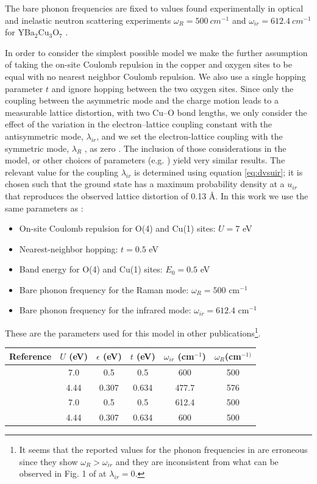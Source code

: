 The bare phonon frequencies are fixed to values found experimentally in optical and inelastic neutron scattering experiments $\omega_R = 500\ cm^{-1}$ and $\omega_{ir} = 612.4\ cm^{-1}$ for YBa$_2$Cu$_3$O$_7$ \cite{?}.

In order to consider the simplest possible model we make the further assumption of taking the on-site Coulomb repulsion in the copper and oxygen sites to be equal with no nearest neighbor Coulomb repulsion. 
We also use a single hopping parameter $t$ and ignore hopping between the two oxygen sites. 
Since only the coupling between the asymmetric mode and the charge motion leads to a measurable lattice distortion, with two Cu–O bond lengths, we only consider the effect of the variation in the electron–lattice coupling constant with the antisymmetric mode, $\lambda_{ir}$, and we set the electron-lattice coupling with the symmetric mode, $\lambda_R$ , as zero \cite{Salkola1995}. 
The inclusion of those considerations in the model, or other choices of parameters (e.g. \cite{Salkola1994, Salkola1995}) yield very similar results.
The relevant value for the coupling $\lambda_{ir}$ is determined using equation \ref{eq:dvsuir}; it is chosen such that the ground state has a maximum probability density at a $u_{ir}$ that reproduces the observed lattice distortion of 0.13 \AA \cite{?}.
In this work we use the same parameters as \cite{Mena2006, DeLeon1999, Leon2008, MirandaMena2007}:

\begin{itemize}
\item On-site Coulomb repulsion for O(4) and Cu(1) sites: $U=7$ eV
\item Nearest-neighbor hopping: $t=0.5$ eV
\item Band energy for O(4) and Cu(1) sites: $E_0=0.5$ eV
\item Bare phonon frequency for the Raman mode: $\omega_R=500$ cm$^{-1}$
\item Bare phonon frequency for the infrared mode: $\omega_{ir}=612.4$ cm$^{-1}$
\end{itemize}

These are the parameters used for this model in other publications\footnote{It seems that the reported values for the phonon frequencies in \cite{Salkola1994, Salkola1995} are erroneous since they show $\omega_R > \omega_{ir}$ and they are inconsistent from what can be observed in Fig. 1 of \cite{Salkola1994} at $\lambda_{ir}=0$.}.

\noindent\begin{tabular}{| l | c | c | c | c | c |}
\hline
Reference & $U$ (eV) & $\epsilon$ (eV) & $t$ (eV) & $\omega_{ir}$ (cm$^{-1}$) & $\omega_R$(cm$^{-1)}$ \\
\hline
\cite{MustredeLeon1992} & 7.0 & 0.5 & 0.5 & 600 & 500 \\ 
\cite{Salkola1994, Salkola1995} & 4.44 & 0.307 & 0.634 & 477.7 & 576  \\
\cite{Mena2006,DeLeon1999, Leon2008, MirandaMena2007} & 7.0 & 0.5 & 0.5 & 612.4 & 500 \\ 
\cite{MustredeLeon2000} & 4.44 & 0.307 & 0.634 & 600 & 500 \\
\hline
\end{tabular}

